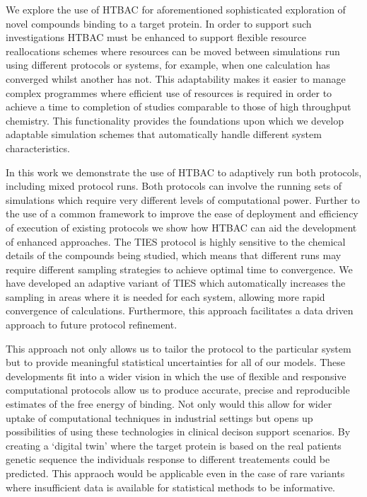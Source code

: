 We explore the use of HTBAC for aforementioned sophisticated
exploration of novel compounds binding to a target protein.
In order to support such investigations HTBAC must be enhanced to support
flexible resource reallocations schemes where resources can be moved between
simulations run using different protocols or systems, for example, when one
calculation has converged whilst another has not. This adaptability makes it
easier to manage complex programmes where efficient use of resources is
required in order to achieve a time to completion of studies comparable to
those of high throughput chemistry. This functionality provides the
foundations upon which we develop adaptable simulation schemes 
that automatically handle different system characteristics.

In this work we demonstrate the use of HTBAC to adaptively run both protocols,
including mixed protocol runs. Both protocols can involve the running sets of
simulations which require very different levels of computational power.
Further to the use of a common framework to improve the ease of deployment and
efficiency of execution of existing protocols we show how HTBAC can aid the
development of enhanced approaches. 
The TIES protocol is highly sensitive to the chemical details of the compounds being studied, which means that different runs may require different sampling strategies to achieve optimal time to convergence. 
We have developed an adaptive variant of TIES which automatically increases the sampling in areas where it is needed for each system, allowing more rapid convergence of calculations. 
Furthermore, this approach facilitates a data driven approach to future
protocol refinement.

This approach not only allows us to tailor the protocol to the particular system but to provide meaningful statistical uncertainties for all of our models.
These developments fit into a wider vision in which the use of flexible and 
responsive computational protocols allow us to produce accurate, precise and 
reproducible estimates of the free energy of binding.
Not only would this allow for wider uptake of computational techniques in industrial settings but opens up possibilities of using these technologies 
in clinical decison support scenarios.
By creating a `digital twin' where the target protein is based on the real patients genetic sequence the individuals response to different treatements could be predicted.
This appraoch would be applicable even in the case of rare variants where insufficient data is available for statistical methods to be informative.

